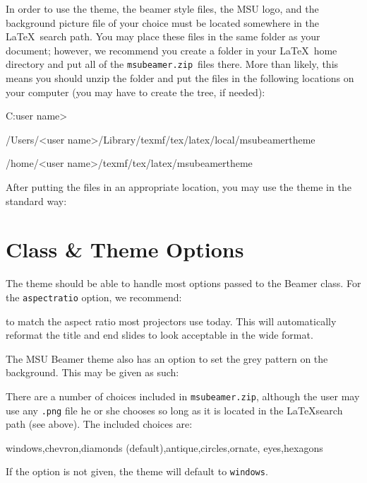 \documentclass[11pt]{article}
\newcommand{\zip}{\lstinline[basicstyle=\ttfamily]!msubeamer.zip!}
\begin{document}
In order to use the theme, the beamer style files, the MSU logo, and the background picture file of your choice must be located somewhere in the \LaTeX\ search path.  You may place these files in the same folder as your document; however, we recommend you create a folder in your \LaTeX\ home directory and put all of the \zip\ files there.  More than likely, this means you should unzip the folder and put the files in the following locations on your computer (you may have to create the tree, if needed):

\begin{tex}
C:\Users\<user name>\texmf\tex\latex\local\msubeamertheme

/Users/<user name>/Library/texmf/tex/latex/local/msubeamertheme

/home/<user name>/texmf/tex/latex/msubeamertheme
\end{tex}

After putting the files in an appropriate location, you may use the theme in the standard way:


\section{Class \& Theme Options}

The theme should be able to handle most options passed to the Beamer class.  For the \lstinline[basicstyle=\ttfamily]!aspectratio! option, we recommend:
to match the aspect ratio most projectors use today.  This will automatically reformat the title and end slides to look acceptable in the wide format.

The MSU Beamer theme also has an option to set the grey pattern on the background.  This may be given as such:
\begin{tex}
\end{tex}
There are a number of choices included in \zip, although the user may use any \lstinline[basicstyle=\ttfamily]!.png! file he or she chooses so long as it is located in the \LaTeX search path (see above).  The included choices are:
\begin{tex}
windows,chevron,diamonds (default),antique,circles,ornate,
eyes,hexagons
\end{tex}
If the option is not given, the theme will default to \lstinline[basicstyle=\ttfamily]!windows!.
\end{document}
